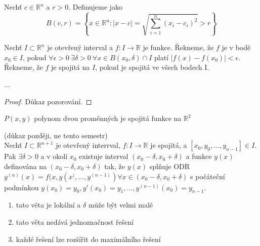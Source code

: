 \begin{definice}
	Nechť $c \in \mathbb{R}^{n}$ a $r>0$. Definujeme  jako 
	\[ B(c, r) = \left\{ x \in \mathbb{R}^{n} : |x - c|  
	= \sqrt{\sum_{i = 1}^{n} (x_i - c_i)^{2}} > r \right\} \]
\end{definice}

\begin{definice}
	Nechť $I \subset \mathbb{R}^{n}$ je otevřený interval a $f: I \to \mathbb{R}$ je funkce. Řekneme, že $f$ je
	 v bodě $x_0 \in I$, pokud $\forall \epsilon > 0 \  \exists \delta > 0 \ 
	\forall x \in B(x_0, \delta) \cap I$ platí $|f(x) - f(x_0)| < \epsilon$.
	Řekneme, že $f$ je spojitá na $I$, pokud je spojitá ve všech bodech I.
\end{definice}

\begin{pozorovani}
	...
\end{pozorovani}

\begin{proof}
	Důkaz pozorování.
\end{proof}

\begin{dusledek}
	\(P(x,y)\) polynom dvou proměnných je spojitá funkce na \(\mathbb{R}^{2}\)
\end{dusledek}

\begin{vetat}
	 (důkaz později, ne tento semestr)
	\\
	Nechť \(I \subset \mathbb{R}^{n+1}\) je otevřený interrval, \(f: I \to \mathbb{R}\) je spojitá, a \linebreak[1]
	\([x_0, y_0, \dots, y_{n-1}] \in I\). Pak \linebreak[1] \(\exists \delta > 0\) a v okolí \linebreak[1]
	\(x_0\) existuje interval \linebreak[1] \((x_0- \delta , x_0 + \delta)\) a funkce \(y(x)\) definována na 
	\linebreak[1] \((x_0 - \delta, x_0 + \delta)\) tak, že \(y(x)\) splňuje ODR \linebreak[1]
	\(y^{(n)}(x) = f(x, y(x^), \dots, y^{(n-1)}) \forall x \in (x_0 - \delta, x_0 + \delta)\) s počáteční podmínkou 
	\(y(x_0) = y_0, y'(x_0) = y_1, \dots , y^{(n-1)}(x_0) = y_{n-1}\).
\end{vetat}

\begin{pozn}
\begin{enumerate}
	\item tato věta je lokální a \(\delta\) může být velmi malé
	\item tato věta nedává jednoznačnost řešení
	\item každé řešení lze rozšířit do maximálního řešení
\end{enumerate}
\end{pozn}


